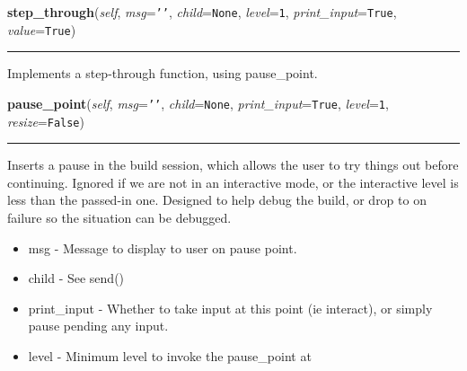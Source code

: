     \vspace{0.5ex}

\hspace{.8\funcindent}\begin{boxedminipage}{\funcwidth}

    \raggedright \textbf{step\_through}(\textit{self}, \textit{msg}={\tt \texttt{'}\texttt{}\texttt{'}}, \textit{child}={\tt None}, \textit{level}={\tt 1}, \textit{print\_input}={\tt True}, \textit{value}={\tt True})

    \vspace{-1.5ex}

    \rule{\textwidth}{0.5\fboxrule}
\setlength{\parskip}{2ex}
    Implements a step-through function, using pause\_point.

\setlength{\parskip}{1ex}
    \end{boxedminipage}

    \label{shutit_global:ShutIt:pause_point}

    \vspace{0.5ex}

\hspace{.8\funcindent}\begin{boxedminipage}{\funcwidth}

    \raggedright \textbf{pause\_point}(\textit{self}, \textit{msg}={\tt \texttt{'}\texttt{}\texttt{'}}, \textit{child}={\tt None}, \textit{print\_input}={\tt True}, \textit{level}={\tt 1}, \textit{resize}={\tt False})

    \vspace{-1.5ex}

    \rule{\textwidth}{0.5\fboxrule}
\setlength{\parskip}{2ex}
    Inserts a pause in the build session, which allows the user to try 
    things out before continuing. Ignored if we are not in an interactive 
    mode, or the interactive level is less than the passed-in one. Designed
    to help debug the build, or drop to on failure so the situation can be 
    debugged.

    \begin{itemize}
    \setlength{\parskip}{0.6ex}
      \item msg         - Message to display to user on pause point.

      \item child       - See send()

      \item print\_input - Whether to take input at this point (ie interact), 
        or simply pause pending any input.

      \item level       - Minimum level to invoke the pause\_point at

    \end{itemize}

\setlength{\parskip}{1ex}
    \end{boxedminipage}


